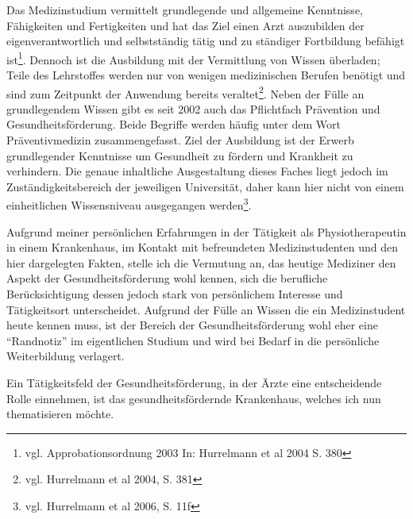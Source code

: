 Das Medizinstudium vermittelt  grundlegende und allgemeine Kenntnisse, Fähigkeiten und Fertigkeiten und hat das Ziel einen Arzt auszubilden der eigenverantwortlich und selbstständig tätig und zu ständiger Fortbildung befähigt ist\footnote{vgl. Approbationsordnung 2003 In: Hurrelmann et al 2004 S. 380}. Dennoch ist die Ausbildung mit der Vermittlung von Wissen überladen; Teile des Lehrstoffes werden nur von wenigen medizinischen Berufen benötigt und sind zum Zeitpunkt der Anwendung bereits veraltet\footnote{vgl. Hurrelmann et al 2004, S. 381}. Neben der Fülle an grundlegendem Wissen gibt es seit 2002 auch das Pflichtfach Prävention und Gesundheitsförderung. Beide Begriffe werden häufig unter dem Wort Präventivmedizin zusammengefasst. Ziel der Ausbildung ist der Erwerb grundlegender Kenntnisse um Gesundheit zu fördern und Krankheit zu verhindern. Die genaue inhaltliche Ausgestaltung dieses Faches liegt jedoch im Zuständigkeitsbereich der jeweiligen Universität, daher kann hier nicht von einem einheitlichen Wissensniveau ausgegangen werden\footnote{vgl. Hurrelmann et al 2006, S. 11f}. 

Aufgrund meiner persönlichen Erfahrungen in der Tätigkeit als Physiotherapeutin in einem Krankenhaus, im Kontakt mit befreundeten Medizinstudenten und den hier dargelegten Fakten, stelle ich die Vermutung an, das heutige Mediziner den Aspekt der Gesundheitsförderung wohl kennen, sich die berufliche Berücksichtigung dessen jedoch stark von persönlichem Interesse und Tätigkeitsort unterscheidet. Aufgrund der Fülle an Wissen die ein Medizinstudent heute kennen muss, ist der Bereich der Gesundheitsförderung wohl eher eine "`Randnotiz"' im eigentlichen Studium und wird bei Bedarf in die persönliche Weiterbildung verlagert. 

Ein Tätigkeitsfeld der Gesundheitsförderung, in der Ärzte eine entscheidende Rolle einnehmen, ist das gesundheitsfördernde Krankenhaus, welches ich nun thematisieren möchte.

